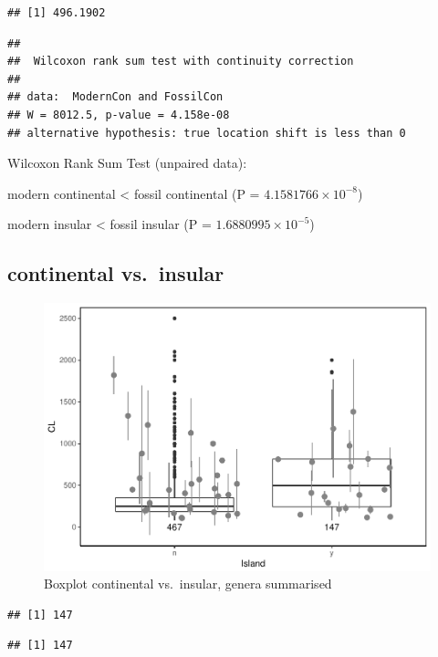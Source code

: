 \documentclass[]{article}
\begin{document}
\begin{verbatim}
## [1] 496.1902
\end{verbatim}

\begin{verbatim}
## 
##  Wilcoxon rank sum test with continuity correction
## 
## data:  ModernCon and FossilCon
## W = 8012.5, p-value = 4.158e-08
## alternative hypothesis: true location shift is less than 0
\end{verbatim}

Wilcoxon Rank Sum Test (unpaired data):

modern continental \textless{} fossil continental (P =
\(4.1581766\times 10^{-8}\))

modern insular \textless{} fossil insular (P =
\(1.6880995\times 10^{-5}\))

\newpage

\subsection{continental vs.~insular}\label{continental-vs.insular-1}

\begin{figure}[htbp]
\centering
\includegraphics{MA_JJ_files/figure-latex/Boxplot continental vs. insular-1.pdf}
\caption{Boxplot continental vs.~insular, genera summarised}
\end{figure}

\begin{verbatim}
## [1] 147
\end{verbatim}

\begin{verbatim}
## [1] 147
\end{verbatim}
\end{document}
